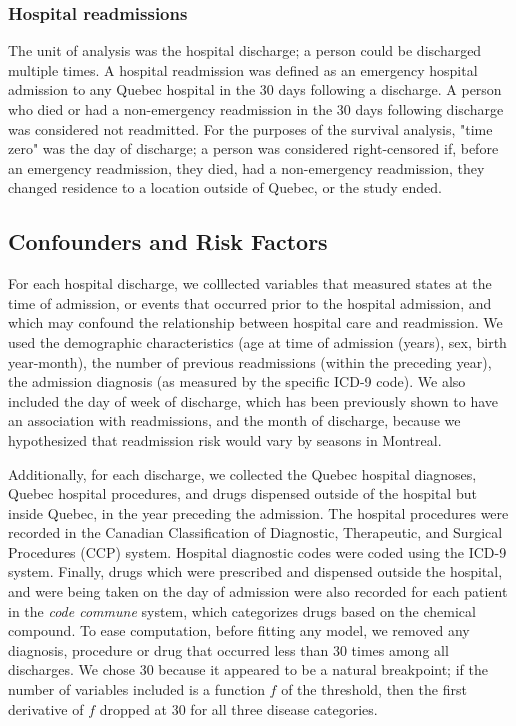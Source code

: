 \documentclass[]{article}\usepackage[]{graphicx}\usepackage[]{color}
\begin{document}
\subsubsection{Hospital readmissions}
The unit of analysis was the hospital discharge; a person could be discharged multiple times. A hospital readmission was defined as an emergency hospital admission to any Quebec hospital in the 30 days following a discharge.  A person who died or had a non-emergency readmission in the 30 days following discharge was considered not readmitted. For the purposes of the survival analysis, "time zero" was the day of discharge; a person was considered right-censored if, before an emergency readmission, they died, had a non-emergency readmission, they changed residence to a location outside of Quebec, or the study ended. 

\subsection{Confounders and Risk Factors}
For each hospital discharge, we colllected variables that measured states at the time of admission, or events that occurred prior to the hospital admission, and which may confound the relationship between hospital care and readmission. We used the demographic characteristics (age at time of admission (years), sex, birth year-month), the number of previous readmissions (within the preceding year), the admission diagnosis (as measured by the specific ICD-9 code). We also included the day of week of discharge, which has been previously shown to have an association with readmissions\supercite{}, and the month of discharge, because we hypothesized that readmission risk would vary by seasons in Montreal.

Additionally, for each discharge, we collected the Quebec hospital diagnoses, Quebec hospital procedures, and drugs dispensed outside of the hospital but inside Quebec, in the year preceding the admission. The hospital procedures were recorded in the Canadian Classification of Diagnostic, Therapeutic, and Surgical Procedures (CCP) system. Hospital diagnostic codes were coded using the ICD-9 system. Finally, drugs which were prescribed and dispensed outside the hospital, and were being taken on the day of admission were also recorded for each patient in the \emph{code commune} system, which categorizes drugs based on the chemical compound. To ease computation, before fitting any model, we removed any diagnosis, procedure or drug that occurred less than 30 times among all discharges. We chose 30 because it appeared to be a natural breakpoint; if the number of variables included is a function $f$ of the threshold, then the first derivative of $f$ dropped at 30 for all three disease categories.
\end{document}
